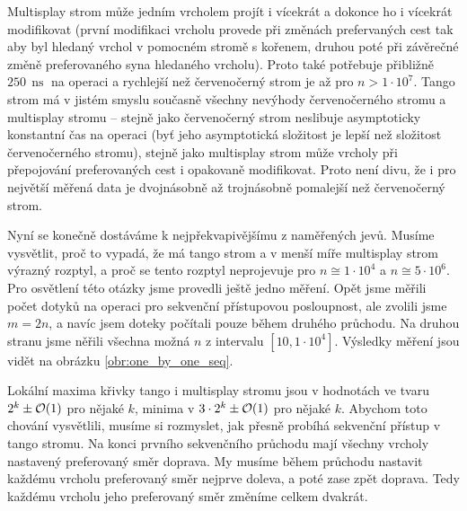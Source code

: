 Multisplay strom může jedním vrcholem projít i vícekrát a dokonce
ho i vícekrát modifikovat (první modifikaci vrcholu provede při změnách
prefervaných cest tak aby byl hledaný vrchol v pomocném stromě s kořenem,
druhou poté při závěrečné změně preferovaného syna hledaného vrcholu). Proto
také potřebuje přibližně $250\,\operatorname{ns}$ na operaci a rychlejší než
červenočerný strom je až pro $n>1\cdot 10^7$. Tango strom má v jistém smyslu
současně všechny nevýhody červenočerného stromu a multisplay stromu -- stejně
jako červenočerný strom neslibuje asymptoticky konstantní čas na operaci (byť
jeho asymptotická složitost je lepší než složitost červenočerného stromu),
stejně jako multisplay strom může vrcholy při přepojování preferovaných cest i
opakovaně modifikovat. Proto není divu, že i pro největší měřená data je
dvojnásobně až trojnásobně pomalejší než červenočerný strom.

Nyní se konečně dostáváme k nejpřekvapivějšímu z naměřených jevů. Musíme vysvětlit, proč to vypadá, že má tango strom a v menší míře multisplay strom výrazný rozptyl, a proč se tento rozptyl neprojevuje pro $n\cong 1\cdot 10^4$ a $n\cong 5\cdot10^6$. Pro osvětlení této otázky jsme provedli ještě jedno měření. Opět jsme měřili počet dotyků na operaci pro sekvenční přístupovou posloupnost, ale zvolili jsme $m=2n$, a navíc jsem doteky počítali pouze během druhého průchodu. Na druhou stranu jsme něřili všechna možná $n$ z intervalu $[10, 1\cdot10^4]$. Výsledky měření jsou vidět na obrázku \ref{obr:one_by_one_seq}.


Lokální maxima křivky tango i multisplay stromu jsou v hodnotách ve tvaru $2^k \pm \mathcal O(1)$ pro nějaké $k$, minima v $3\cdot 2^k\pm \mathcal O(1)$ pro nějaké $k$. Abychom toto chování vysvětlili, musíme si rozmyslet, jak přesně probíhá sekvenční přístup v tango stromu. Na konci prvního sekvenčního průchodu mají všechny vrcholy nastavený preferovaný směr doprava. My musíme během průchodu nastavit každému vrcholu preferovaný směr nejprve doleva, a poté zase zpět doprava. Tedy každému vrcholu jeho preferovaný směr změníme celkem dvakrát.

